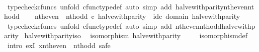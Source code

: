 \begin{isabellebody}
\ \ \ \ \isamarkupfalse%
\ {\isacharparenleft}{\kern0pt}typecheck{\isacharunderscore}{\kern0pt}cfuncs{\isacharcomma}{\kern0pt}\ unfold\ cfunc{\isacharunderscore}{\kern0pt}type{\isacharunderscore}{\kern0pt}def{\isacharcomma}{\kern0pt}\ auto\ simp\ add{\isacharcolon}{\kern0pt}\ halve{\isacharunderscore}{\kern0pt}with{\isacharunderscore}{\kern0pt}parity{\isacharunderscore}{\kern0pt}nth{\isacharunderscore}{\kern0pt}even{\isacharunderscore}{\kern0pt}nth{\isacharunderscore}{\kern0pt}odd{\isacharparenright}{\kern0pt}\isanewline
\ \ \isamarkupfalse%
\ {\isachardoublequoteopen}nth{\isacharunderscore}{\kern0pt}even\ {\isasymamalg}\ nth{\isacharunderscore}{\kern0pt}odd\ {\isasymcirc}\isactrlsub c\ halve{\isacharunderscore}{\kern0pt}with{\isacharunderscore}{\kern0pt}parity\ {\isacharequal}{\kern0pt}\ id\isactrlsub c\ {\isacharparenleft}{\kern0pt}domain\ halve{\isacharunderscore}{\kern0pt}with{\isacharunderscore}{\kern0pt}parity{\isacharparenright}{\kern0pt}{\isachardoublequoteclose}\isanewline
\ \ \ \ \isamarkupfalse%
\ {\isacharparenleft}{\kern0pt}typecheck{\isacharunderscore}{\kern0pt}cfuncs{\isacharcomma}{\kern0pt}\ unfold\ cfunc{\isacharunderscore}{\kern0pt}type{\isacharunderscore}{\kern0pt}def{\isacharcomma}{\kern0pt}\ auto\ simp\ add{\isacharcolon}{\kern0pt}\ nth{\isacharunderscore}{\kern0pt}even{\isacharunderscore}{\kern0pt}nth{\isacharunderscore}{\kern0pt}odd{\isacharunderscore}{\kern0pt}halve{\isacharunderscore}{\kern0pt}with{\isacharunderscore}{\kern0pt}parity{\isacharparenright}{\kern0pt}\isanewline
{}\isamarkupfalse%
%
\endisatagproof
{\isafoldproof}%
%
\isadelimproof
\isanewline
%
\endisadelimproof
\isanewline
{}\isamarkupfalse%
\ halve{\isacharunderscore}{\kern0pt}with{\isacharunderscore}{\kern0pt}parity{\isacharunderscore}{\kern0pt}iso{\isacharcolon}{\kern0pt}\isanewline
\ \ {\isachardoublequoteopen}isomorphism\ halve{\isacharunderscore}{\kern0pt}with{\isacharunderscore}{\kern0pt}parity{\isachardoublequoteclose}\isanewline
%
\isadelimproof
\ \ \ %
\endisadelimproof
%
\isatagproof
{}\isamarkupfalse%
\ isomorphism{\isacharunderscore}{\kern0pt}def\isanewline
{}\isamarkupfalse%
\ {\isacharparenleft}{\kern0pt}intro\ exI{\isacharbrackleft}{\kern0pt}\ x{\isacharequal}{\kern0pt}{\isachardoublequoteopen}nth{\isacharunderscore}{\kern0pt}even\ {\isasymamalg}\ nth{\isacharunderscore}{\kern0pt}odd{\isachardoublequoteclose}{\isacharbrackright}{\kern0pt}{\isacharcomma}{\kern0pt}\ safe{\isacharparenright}{\kern0pt}\isanewline
\ \ \isamarkupfalse%

\end{isabellebody}
